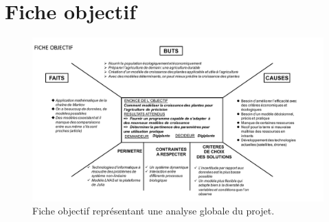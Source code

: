 \section{Fiche objectif}
\label{ann:fiche_obj}
\begin{figure}[H]
  \begin{center}
  \includegraphics[scale=0.61,angle=90]{./annexes/fiche_objectif.pdf}
  \end{center}
  \caption{Fiche objectif représentant une analyse globale du projet.}
  \label{fig:fiche_obj}
\end{figure}